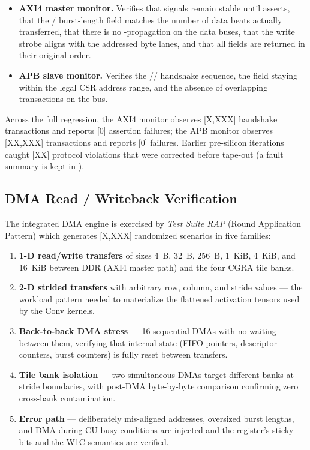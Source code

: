 \begin{itemize}[leftmargin=1.4cm,itemsep=2pt,topsep=2pt]
\item \textbf{AXI4 master monitor.} Verifies that  signals
remain stable until  asserts, that the
/ burst-length field matches the number of
data beats actually transferred, that there is no
-propagation on the data buses, that the write strobe
 aligns with the addressed byte lanes, and that all
 fields are returned in their original order.
\item \textbf{APB slave monitor.} Verifies the
// handshake sequence, the
 field staying within the legal CSR address range, and
the absence of overlapping transactions on the bus.
\end{itemize}

Across the full regression, the AXI4 monitor observes [X{,}XXX]
handshake transactions and reports [0] assertion failures; the APB
monitor observes [XX{,}XXX] transactions and reports [0] failures.
Earlier pre-silicon iterations caught [XX] protocol violations that
were corrected before tape-out (a fault summary is kept in
).

\subsection{DMA Read / Writeback Verification}
\label{ssec:dma-tests}

The integrated DMA engine is exercised by \emph{Test Suite RAP}
(Round Application Pattern) which generates [X{,}XXX] randomized
scenarios in five families:

\begin{enumerate}[leftmargin=1.4cm,itemsep=2pt,topsep=2pt]
\item \textbf{1-D read/write transfers} of sizes 4~B, 32~B, 256~B,
1~KiB, 4~KiB, and 16~KiB between DDR (AXI4 master path) and the
four CGRA tile banks.
\item \textbf{2-D strided transfers} with arbitrary row, column, and
stride values --- the workload pattern needed to materialize the
flattened activation tensors used by the Conv kernels.
\item \textbf{Back-to-back DMA stress} --- 16 sequential DMAs with
no waiting between them, verifying that internal state (FIFO
pointers, descriptor counters, burst counters) is fully reset
between transfers.
\item \textbf{Tile bank isolation} --- two simultaneous DMAs target
different banks at -stride boundaries, with
post-DMA byte-by-byte comparison confirming zero cross-bank
contamination.
\item \textbf{Error path} --- deliberately mis-aligned addresses,
oversized burst lengths, and DMA-during-CU-busy conditions are
injected and the  register's sticky bits and the
 W1C semantics are verified.
\end{enumerate}

